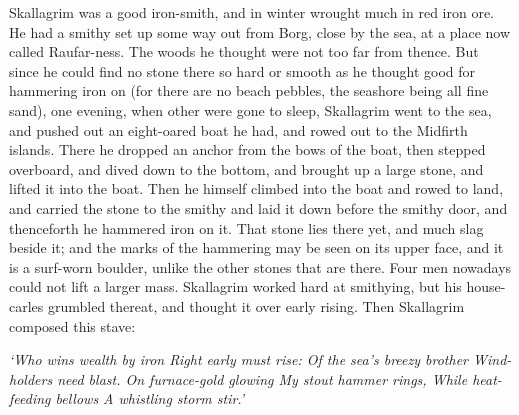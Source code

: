 Skallagrim was a good iron-smith, and in winter wrought much in red iron ore. He had a smithy set up some way out from Borg, close by the sea, at a place now called Raufar-ness. The woods he thought were not too far from thence. But since he could find no stone there so hard or smooth as he thought good for hammering iron on (for there are no beach pebbles, the seashore being all fine sand), one evening, when other were gone to sleep, Skallagrim went to the sea, and pushed out an eight-oared boat he had, and rowed out to the Midfirth islands. There he dropped an anchor from the bows of the boat, then stepped overboard, and dived down to the bottom, and brought up a large stone, and lifted it into the boat. Then he himself climbed into the boat and rowed to land, and carried the stone to the smithy and laid it down before the smithy door, and thenceforth he hammered iron on it. That stone lies there yet, and much slag beside it; and the marks of the hammering may be seen on its upper face, and it is a surf-worn boulder, unlike the other stones that are there. Four men nowadays could not lift a larger mass. Skallagrim worked hard at smithying, but his house-carles grumbled thereat, and thought it over early rising. Then Skallagrim composed this stave:

{\centering\emph{
	`Who wins wealth by iron
	Right early must rise:
	Of the sea's breezy brother
	Wind-holders need blast.
	On furnace-gold glowing
	My stout hammer rings,
	While heat-feeding bellows
	A whistling storm stir.'
}}
